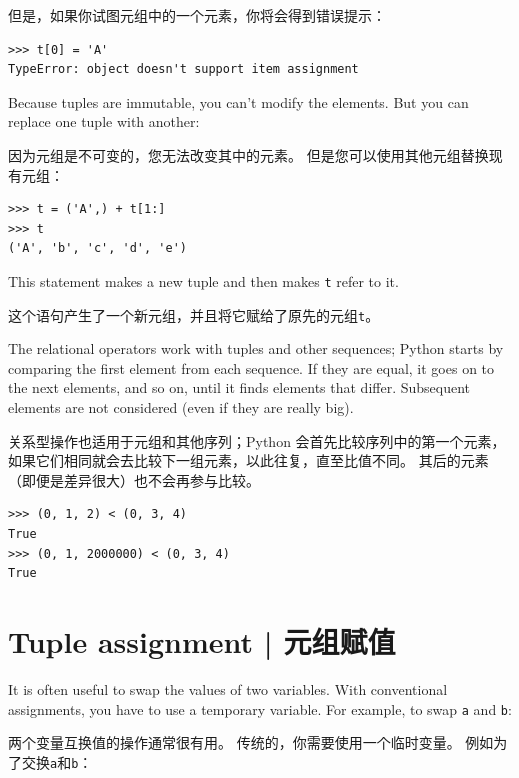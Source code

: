 但是，如果你试图元组中的一个元素，你将会得到错误提示：


\begin{lstlisting}
>>> t[0] = 'A'
TypeError: object doesn't support item assignment
\end{lstlisting}
%
Because tuples are immutable, you can't modify the elements.  But you
can replace one tuple with another:

因为元组是不可变的，您无法改变其中的元素。 但是您可以使用其他元组替换现有元组：

\begin{lstlisting}
>>> t = ('A',) + t[1:]
>>> t
('A', 'b', 'c', 'd', 'e')
\end{lstlisting}
%
This statement makes a new tuple and then makes {\tt t} refer to it.

这个语句产生了一个新元组，并且将它赋给了原先的元组\lstinline{t}。

The relational operators work with tuples and other sequences;
Python starts by comparing the first element from each
sequence.  If they are equal, it goes on to the next elements,
and so on, until it finds elements that differ.  Subsequent
elements are not considered (even if they are really big).

关系型操作也适用于元组和其他序列；Python 会首先比较序列中的第一个元素，如果它们相同就会去比较下一组元素，以此往复，直至比值不同。 其后的元素（即便是差异很大）也不会再参与比较。


\begin{lstlisting}
>>> (0, 1, 2) < (0, 3, 4)
True
>>> (0, 1, 2000000) < (0, 3, 4)
True
\end{lstlisting}


\section{Tuple assignment | 元组赋值}
\label{tuple.assignment}  
 

It is often useful to swap the values of two variables.
With conventional assignments, you have to use a temporary
variable.  For example, to swap {\tt a} and {\tt b}:

两个变量互换值的操作通常很有用。 传统的，你需要使用一个临时变量。 例如为了交换\lstinline{a}和\lstinline{b}：

